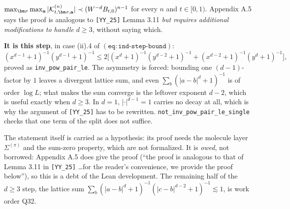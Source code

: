 \begin{theorem}\label{hyp:Kbound}
  $\max_{\bm\sigma}\max_{\mathbf a}|\Kcal^{(n)}_{t,\bm\sigma,\mathbf a}|\prec(W^{-d}B_{t,0})^{n-1}$
  for every $n$ and $t\in[0,1)$.  Appendix A.5 says the proof is analogous to
  \texttt{[YY\_25]} Lemma 3.11 \emph{but requires additional modifications to handle
  $d\ge3$}, without saying which.

  \textbf{It is this step}, in case (ii).4 of $\mathtt{(eq{:}ind\text{-}step\text{-}bound)}$:
  \[(x^{d-1}+1)^{-1}(y^{d-1}+1)^{-1}\le 2\bigl[(x^{d}+1)^{-1}(y^{d-2}+1)^{-1}+(x^{d-2}+1)^{-1}(y^{d}+1)^{-1}\bigr],\]
  proved as \texttt{inv\_pow\_pair\_le}.  The asymmetry is forced: bounding one
  $(d-1)$-factor by $1$ leaves a divergent lattice sum, and even
  $\sum_b(|a-b|^d+1)^{-1}$ is of order $\log L$; what makes the sum converge is the
  leftover exponent $d-2$, which is useful exactly when $d\ge3$.  In $d=1$,
  $|\cdot|^{d-1}=1$ carries no decay at all, which is why the argument of \texttt{[YY\_25]}
  has to be rewritten.  \texttt{not\_inv\_pow\_pair\_le\_single} checks that one term of
  the split does not suffice.

  The statement itself is carried as a hypothesis: its proof needs the molecule layer
  $\Sigma^{(\pi)}$ and the sum-zero property, which are not formalized.  It is
  \emph{owed}, not borrowed: Appendix A.5 does give the proof (``the proof is analogous to
  that of Lemma 3.11 in \texttt{[YY\_25]} \dots for the reader's convenience, we provide
  the proof below''), so this is a debt of the Lean development.  The remaining
  half of the $d\ge3$ step, the lattice sum
  $\sum_b(|a-b|^d+1)^{-1}(|c-b|^{d-2}+1)^{-1}\lesssim1$, is work order Q32.
\end{theorem}

